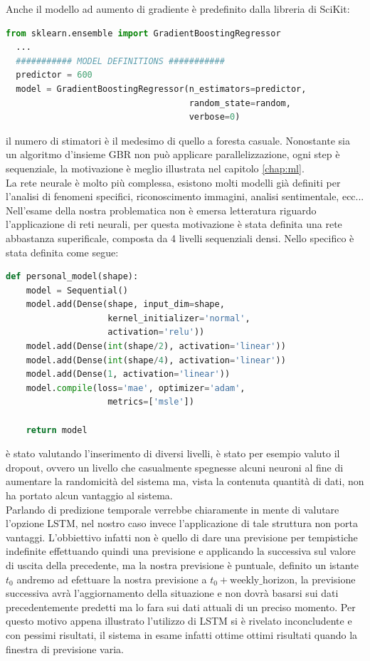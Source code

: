 \documentclass[%
    corpo=12pt,
    twoside,
    oldstyle,
    autoretitolo,
    greek,
    evenboxes,
]{toptesi}
\begin{document}
Anche il modello ad aumento di gradiente è predefinito dalla libreria di SciKit:
\begin{lstlisting}[language=Python, frame=single, basicstyle=\small]
  from sklearn.ensemble import GradientBoostingRegressor
  ...
  ########### MODEL DEFINITIONS ###########
  predictor = 600
  model = GradientBoostingRegressor(n_estimators=predictor,
                                    random_state=random, 
                                    verbose=0)
\end{lstlisting}
il numero di stimatori è il medesimo di quello a foresta casuale. Nonostante sia un algoritmo d'insieme GBR non può applicare parallelizzazione, ogni step è sequenziale, la motivazione è meglio illustrata nel capitolo \ref{chap:ml}.\\
La rete neurale è molto più complessa, esistono molti modelli già definiti per l'analisi di fenomeni specifici, riconoscimento immagini, analisi sentimentale, ecc... Nell'esame della nostra problematica non è emersa letteratura riguardo l'applicazione di reti neurali, per questa motivazione è stata definita una rete abbastanza superificale, composta da 4 livelli sequenziali densi. Nello specifico è stata definita come segue:
\begin{lstlisting}[language=Python, frame=single, basicstyle=\small]
  def personal_model(shape):
    model = Sequential()
    model.add(Dense(shape, input_dim=shape, 
                    kernel_initializer='normal', 
                    activation='relu'))
    model.add(Dense(int(shape/2), activation='linear'))
    model.add(Dense(int(shape/4), activation='linear'))
    model.add(Dense(1, activation='linear'))
    model.compile(loss='mae', optimizer='adam', 
                    metrics=['msle'])

    return model
\end{lstlisting}
è stato valutando l'inserimento di diversi livelli, è stato per esempio valuto il dropout, ovvero un livello che casualmente spegnesse alcuni neuroni al fine di aumentare la randomicità del sistema ma, vista la contenuta quantità di dati, non ha portato alcun vantaggio al sistema.\\
Parlando di predizione temporale verrebbe chiaramente in mente di valutare l'opzione LSTM, nel nostro caso invece l'applicazione di tale struttura non porta vantaggi. L'obbiettivo infatti non è quello di dare una previsione per tempistiche indefinite effettuando quindi una previsione e applicando la successiva sul valore di uscita della precedente, ma la nostra previsione è puntuale, definito un istante $t_0$ andremo ad efettuare la nostra previsione a $t_0 + \textrm{weekly\_horizon}$, la previsione successiva avrà l'aggiornamento della situazione e non dovrà basarsi sui dati precedentemente predetti ma lo fara sui dati attuali di un preciso momento. Per questo motivo appena illustrato l'utilizzo di LSTM si è rivelato inconcludente e con pessimi risultati, il sistema in esame infatti ottime ottimi risultati quando la finestra di previsione varia.
\end{document}
